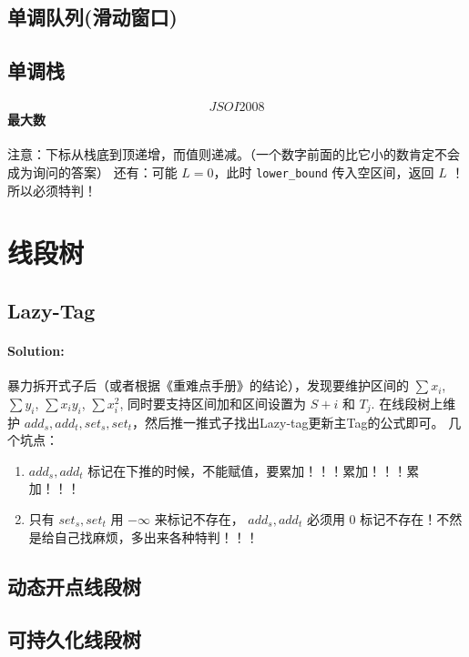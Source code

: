 \documentclass{article}
\begin{document}
		\subsection{单调队列(滑动窗口)}
		
		\subsection{单调栈}
		\paragraph{\[JSOI2008\] 最大数}
		注意：下标从栈底到顶递增，而值则递减。（一个数字前面的比它小的数肯定不会成为询问的答案）
		还有：可能 $L = 0$，此时 \lstinline|lower_bound| 传入空区间，返回 $L$ ！ 所以必须特判！
		

	\newpage

	\section{线段树}
		\subsection{Lazy-Tag} %
			\paragraph{Solution:}
			暴力拆开式子后（或者根据《重难点手册》的结论），发现要维护区间的 $\sum x_i$, $\sum y_i$, $\sum x_i y_i$, $\sum x_i^2$, 同时要支持区间加和区间设置为 $S+i \text{ 和 } T_j$.
			在线段树上维护 $add_s, add_t, set_s, set_t$，然后推一推式子找出Lazy-tag更新主Tag的公式即可。
			几个坑点：
			\begin{enumerate}
				\item $add_s, add_t$ 标记在下推的时候，不能赋值，要累加！！！累加！！！累加！！！
				\item 只有 $set_s, set_t$ 用 $-\infty$ 来标记不存在， $add_s, add_t$ 必须用 $0$ 标记不存在！不然是给自己找麻烦，多出来各种特判！！！
			\end{enumerate}
			
		\subsection{动态开点线段树}

		\subsection{可持久化线段树}
\end{document}
